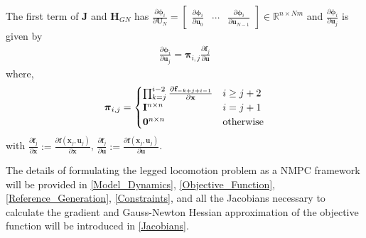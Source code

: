 The first term of $\mathbf{J}$ and $\mathbf{H}_{GN}$ has $\frac{\partial \boldsymbol{\phi}_i}{\partial \mathbf{U}_N}=\begin{bmatrix}\frac{\partial \boldsymbol{\phi}_i}{\partial \mathbf{u}_0} & \cdots & \frac{\partial \boldsymbol{\phi}_i}{\partial \mathbf{u}_{N-1}} \end{bmatrix}\in \mathbb{R}^{n\times Nm}$ and $\frac{\partial \boldsymbol{\phi}_i}{\partial \mathbf{u}_j}$ is given by
\begin{align}
\label{eq:Phi}
\frac{\partial \boldsymbol{\phi}_i}{\partial \mathbf{u}_j}=
\boldsymbol{\pi}_{i,j}\frac{\partial \mathbf{f}_j}{\partial \mathbf{u}}
\end{align}
where, 
\begin{align}
\boldsymbol{\pi}_{i,j}=\begin{cases} \prod_{k=j}^{i-2} \frac{\partial \mathbf{f}_{-k+j+i-1}}{\partial \mathbf{x}} & i\geq j+2\\\mathbf{I}^{n\times n} &i=j+1\\\mathbf{0}^{n\times n} & {\rm otherwise} \end{cases}
\end{align}
with $\frac{\partial \mathbf{f}_j}{\partial \mathbf{x}}:=\frac{\partial \mathbf{f}(\mathbf{x}_j,\mathbf{u}_j)}{\partial \mathbf{x}}$, $\frac{\partial \mathbf{f}_j}{\partial \mathbf{u}}:=\frac{\partial \mathbf{f}(\mathbf{x}_j,\mathbf{u}_j)}{\partial \mathbf{u}}$. \newline


The details of formulating the legged locomotion problem as a NMPC framework will be provided in \ref{Model_Dynamics}, \ref{Objective_Function}, \ref{Reference_Generation}, \ref{Constraints}, and all the Jacobians necessary to calculate the gradient and Gauss-Newton Hessian approximation of the objective function will be introduced in \ref{Jacobians}. 

